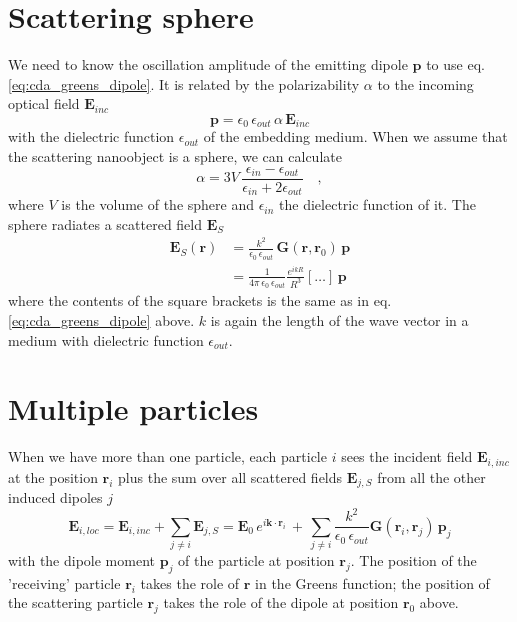 \section{Scattering sphere}

We need to know the oscillation amplitude of the emitting dipole $\mathbf{p}$ to use eq. \ref{eq:cda_greens_dipole}. It is related by the  polarizability $\alpha$  to the incoming optical field $\mathbf{E}_{inc}$
\begin{equation}
\mathbf{p} = \epsilon_0 \, \epsilon_{out} \, \alpha \, \mathbf{E}_{inc}
\end{equation}
with the dielectric function $\epsilon_{out}$ of the embedding medium. 
When we assume that the scattering nanoobject is a sphere, we can calculate
\begin{equation}
 \alpha = 3V \, \frac{\epsilon_{in} - \epsilon_{out}}{\epsilon_{in} + 2 \epsilon_{out}} \quad ,
\end{equation}
where $V$ is the volume of the sphere and  $\epsilon_{in}$ the dielectric function of it. 
The sphere  radiates a scattered field $\mathbf{E}_S$
\begin{align}
\mathbf{E}_S(\mathbf{r}) & =  \frac{k^2}{\epsilon_0 \, \epsilon_{out}} \, \mathbf{G}(\mathbf{r}, \mathbf{r}_0) \,  \mathbf{p} \\
 & =  \frac{1}{4 \pi \, \epsilon_0 \, \epsilon_{out}  }  \frac{e^{i k R} }{  R^3 } 
\left[  \dots \right] \, \mathbf{p}
\end{align}
where the contents of the square brackets is the same as in eq.\ref{eq:cda_greens_dipole} above. $k$ is again the length of the wave vector in a medium with dielectric function $\epsilon_{out}$.

\section{Multiple particles}

When we have more than one particle, each particle $i$ sees the incident field $\mathbf{E}_{i, inc}$ at the   position $\mathbf{r}_i$ plus the sum over all scattered fields $\mathbf{E}_{j, S}$ from all the other induced dipoles $j$
\begin{equation}
\mathbf{E}_{i, loc} = \mathbf{E}_{i, inc} + \sum_{j \neq i} \mathbf{E}_{j, S}
 = \mathbf{E}_{0} \, e^{i \mathbf{k} \cdot \mathbf{r}_i} \, +  \, 
 \sum_{j \neq i} \frac{k^2}{\epsilon_0 \, \epsilon_{out}} 
 \mathbf{G}(\mathbf{r}_i, \mathbf{r}_j) \,  \mathbf{p}_j  \label{eq:cda_elocal}
\end{equation}
with the dipole moment $ \mathbf{p}_j$ of the particle at position $\mathbf{r}_j$. The position of the 'receiving' particle $\mathbf{r}_i$ takes the role of $\mathbf{r}$ in the Greens function; the position of the scattering particle $\mathbf{r}_j$ takes the role of the dipole at position $\mathbf{r}_0$ above.


